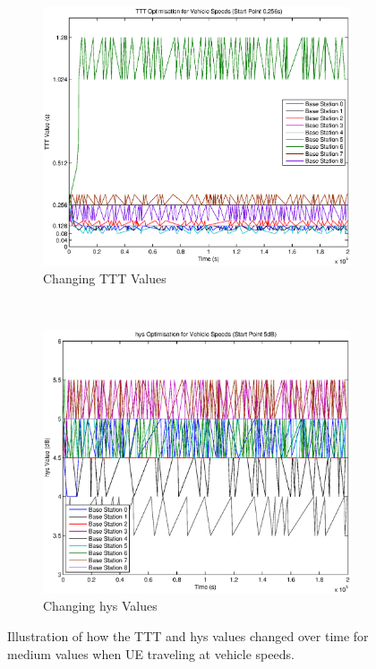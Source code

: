 \begin{figure}[H]
        \centering
        \begin{subfigure}[b]{0.49\textwidth}
                \includegraphics[width=\textwidth]{figures/vehicle_figures/mid/long_ttt.eps}
                \caption{Changing TTT Values}
                \label{fig:veh_mid_ttt}
        \end{subfigure}%
        ~ %
        \begin{subfigure}[b]{0.49\textwidth}
                \includegraphics[width=\textwidth]{figures/vehicle_figures/mid/long_hys.eps}
                \caption{Changing hys Values}
                \label{fig:veh_mid_hys}
        \end{subfigure}
        \caption{Illustration of how the TTT and hys values changed over time for medium values when UE traveling at vehicle speeds.}\label{fig:veh_mid_ttthys}
\end{figure}

